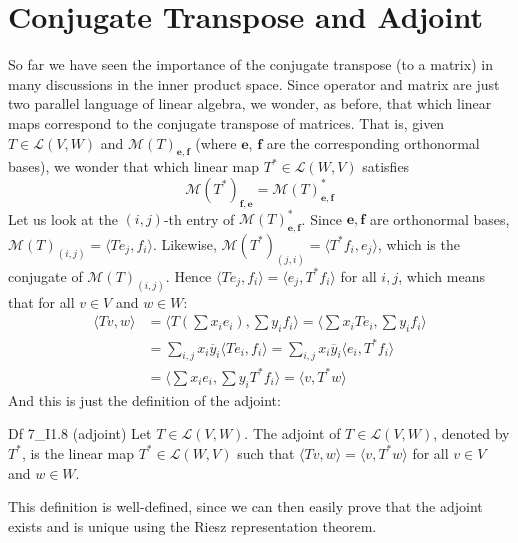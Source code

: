 \documentclass{article}
\begin{document}
\section{Conjugate Transpose and Adjoint}
So far we have seen the importance of the conjugate transpose (to a matrix) in many discussions in the inner product space. Since operator and matrix are just two parallel language of linear algebra, we wonder, as before, that which linear maps correspond to the conjugate transpose of matrices. That is, given $T\in\mathcal{L}(V, W)$ and $\mathcal{M}(T)_{\pmb{e}, \pmb{f}}$ (where $\pmb{e}$, $\pmb{f}$ are the corresponding orthonormal bases), we wonder that which linear map $T^\ast\in\mathcal{L}(W, V)$ satisfies 
$$\mathcal{M}(T^\ast)_{\pmb{f}, \pmb{e}} = \mathcal{M}(T)_{\pmb{e}, \pmb{f}}^\ast$$
Let us look at the $(i,j)$-th entry of $\mathcal{M}(T)_{\pmb{e}, \pmb{f}}^\ast$. Since $\pmb{e}, \pmb{f}$ are orthonormal bases, $\mathcal{M}(T)_{(i,j)} = \langle Te_j, f_i\rangle$. Likewise, $\mathcal{M}(T^\ast)_{(j,i)} = \langle T^\ast f_i, e_j\rangle$, which is the conjugate of $\mathcal{M}(T)_{(i,j)}$. Hence $\langle Te_j, f_i\rangle = \langle e_j, T^\ast f_i\rangle$ for all $i, j$, which means that for all $v\in V$ and $w\in W$:
$$
\begin{aligned}
    \langle Tv, w\rangle &= \langle T\left(\sum x_ie_i\right), \sum y_if_i\rangle = \langle \sum x_iTe_i, \sum y_if_i\rangle \\
    &= \sum_{i,j} x_i\overline{y}_i\langle Te_i, f_i\rangle = \sum_{i,j} x_i\overline{y}_i\langle e_i, T^\ast f_i\rangle \\
    &= \langle \sum x_ie_i, \sum y_iT^\ast f_i\rangle = \langle v, T^\ast w\rangle
\end{aligned}
$$
And this is just the definition of the adjoint:
\begin{Df}{Df 7\_I1.8 (adjoint)}
    Let $T\in\mathcal{L}(V, W)$. The adjoint of $T\in\mathcal{L}(V, W)$, denoted by $T^\ast$, is the linear map $T^\ast\in\mathcal{L}(W, V)$ such that $\langle Tv, w\rangle = \langle v, T^\ast w\rangle$ for all $v\in V$ and $w\in W$.
\end{Df}
\textcolor{Th}{This definition is well-defined, since we can then easily prove that the adjoint exists and is unique using the Riesz representation theorem.}
\end{document}
